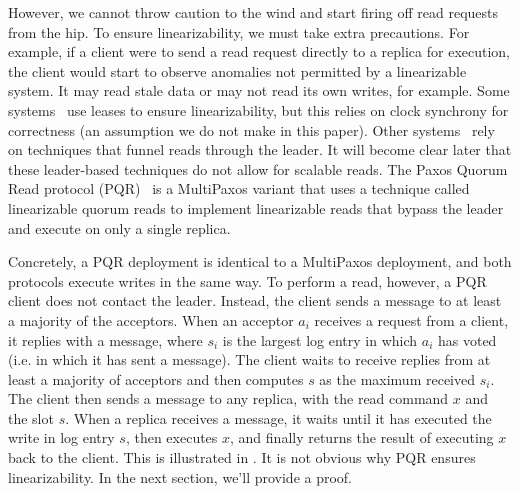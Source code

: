 However, we cannot throw caution to the wind and start firing off read requests
from the hip. To ensure linearizability, we must take extra precautions. For
example, if a client were to send a read request directly to a replica for
execution, the client would start to observe anomalies not permitted by a
linearizable system. It may read stale data or may not read its own writes, for
example.
%
Some systems~\cite{burrows2006chubby} use leases to ensure linearizability, but
this relies on clock synchrony for correctness (an assumption we do not make in
this paper). Other systems~\cite{bolosky2011paxos,ongaro2013search} rely on
techniques that funnel reads through the leader. It will become clear later
that these leader-based techniques do not allow for scalable reads.
%
The Paxos Quorum Read protocol (PQR)~\cite{charapko2019linearizable} is a
MultiPaxos variant that uses a technique called linearizable quorum reads to
implement linearizable reads that bypass the leader and execute on only a
single replica.
%

Concretely, a PQR deployment is identical to a MultiPaxos deployment, and both
protocols execute writes in the same way. To perform a read, however, a PQR
client does not contact the leader. Instead, the client sends a
 message to at least a majority of the acceptors. When an
acceptor $a_i$ receives a  request from a client, it replies
with a  message, where $s_i$ is the largest log entry in
which $a_i$ has voted (i.e. in which it has sent a  message).
The client waits to receive  replies from at least a
majority of acceptors and then computes $s$ as the maximum received $s_i$. The
client then sends a  message to any replica, with the read
command $x$ and the slot $s$. When a replica receives a 
message, it waits until it has executed the write in log entry $s$, then
executes $x$, and finally returns the result of executing $x$ back to the
client. This is illustrated in . It is not obvious
why PQR ensures linearizability. In the next section, we'll provide a proof.

{}
